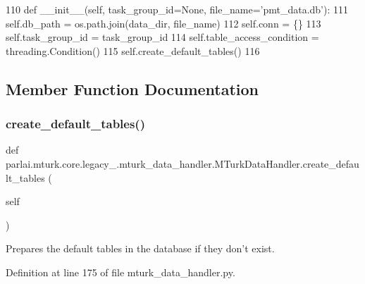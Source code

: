 \begin{DoxyCode}
110     \textcolor{keyword}{def }\_\_init\_\_(self, task\_group\_id=None, file\_name='pmt\_data.db'):
111         self.db\_path = os.path.join(data\_dir, file\_name)
112         self.conn = \{\}
113         self.task\_group\_id = task\_group\_id
114         self.table\_access\_condition = threading.Condition()
115         self.create\_default\_tables()
116 
\end{DoxyCode}


\subsection{Member Function Documentation}
\mbox{\label{classparlai_1_1mturk_1_1core_1_1legacy__2018_1_1mturk__data__handler_1_1MTurkDataHandler_ab2c424e19bb6a0cb664de78869df362a}} 
\subsubsection{\texorpdfstring{create\+\_\+default\+\_\+tables()}{create\_default\_tables()}}
{\footnotesize\ttfamily def parlai.\+mturk.\+core.\+legacy\+\_.\+mturk\+\_\+data\+\_\+handler.\+M\+Turk\+Data\+Handler.\+create\+\_\+default\+\_\+tables (\begin{DoxyParamCaption}\item[{}]{self }\end{DoxyParamCaption})}

\begin{DoxyVerb}Prepares the default tables in the database if they don't exist.
\end{DoxyVerb}
 

Definition at line 175 of file mturk\+\_\+data\+\_\+handler.\+py.


